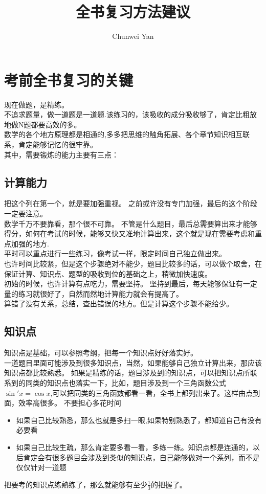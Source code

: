 \documentclass[a4paper]{ctexart}
\author{Chunwei Yan}
\title{全书复习方法建议}
\begin{document}
    \maketitle
\section{考前全书复习的关键}
    现在做题，是{\heiti 精练}。 \\
    不追求题量，做一道题是一道题.该练习的，该吸收的成分吸收够了，肯定比粗放地做N题都要高效的多。\\
    数学的各个地方原理都是相通的,多多把思维的触角拓展、各个章节知识相互联系，肯定能够记忆的很牢靠。\\
    其中，需要锻炼的能力主要有三点：

    \subsection{计算能力}
    把这个列在第一个，就是要加强重视。 之前或许没有专门加强，最后的这个阶段一定要注意。\\
    数学千万不要靠看，那个很不可靠。 不管是什么题目，最后总需要算出来才能够得分，如何在考试的时候，能够又快又准地计算出来，这个就是现在需要考虑和重点加强的地方.\\
    平时可以重点进行一些练习，像考试一样，限定时间自己独立做出来。\\
    也许时间比较紧，但是这个步骤绝对不能少，题目比较多的话，可以做个取舍，在保证计算、知识点、题型的吸收到位的基础之上，稍微加快速度。\\
    初始的时候，也许计算有点吃力，需要坚持。 坚持到最后，每天能够保证有一定量的练习就很好了，自然而然地计算能力就会有提高了。\\
    算错了没有关系，总结，查出错误的地方。但是计算这个步骤不能给少。\\

    \subsection{知识点}
    知识点是基础，可以参照{\heiti 考纲}，把每一个知识点好好落实好。\\
    一道题目里面可能涉及到很多知识点，当然，如果能够自己独立计算出来，那应该知识点都比较熟悉。 
    如果是精练的话，题目涉及到的知识点，可以把知识点所联系到的同类的知识点也落实一下，比如，题目涉及到一个三角函数公式$\sin'{x}=\cos{x}$,可以把同类的三角函数都看一看，全书上都列出来了。这样由点到面，效率高很多。 不要担心多花时间
    \begin{itemize}
        \item 如果自己比较熟悉，那么也就是多扫一眼,如果特别熟悉了，都知道自己有没有必要看
        \item 如果自己比较生疏，那么肯定要多看一看，多练一练。知识点都是连通的，以后肯定会有很多题目会涉及到类似的知识点，自己能够做对一个系列，而不是仅仅针对一道题
    \end{itemize}
    把要考的知识点练熟练了，那么就能够有至少$\frac{1}{3}$的把握了。
\end{document}
